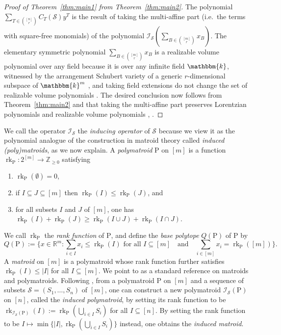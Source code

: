 \documentclass{amsart}
\newcommand{\RR}{\mathbb R}
\newcommand{\ZZ}{\mathbb Z}
\newcommand{\kk}{\mathbbm{k}}
\renewcommand{\P}{\mathrm{P}}
\theoremstyle{plain}
\theoremstyle{definition}
\begin{document}
\begin{proof}[Proof of Theorem~\ref{thm:main1} from Theorem~\ref{thm:main2}]
The polynomial $\sum_{T \in \binom{[n]}{r}}  C_T(\mathcal S) y^T$ is the result of taking the multi-affine part (i.e.\ the terms with square-free monomials) of the polynomial $\mathcal I_{\mathcal S}(\sum_{B\in \binom{[m]}{r}} x_B)$.
The elementary symmetric polynomial $\sum_{B\in \binom{[m]}{r}} x_B$ is a realizable volume polynomial over any field because it is over any infinite field $\kk$, witnessed by the arrangement Schubert variety of a generic $r$-dimensional subspace of $\kk^m$ \cite[Example 3.5]{Huh2026VolumePolynomials}, and taking field extensions do not change the set of realizable volume polynomials \cite[Proposition 2.10]{GHMSW2025volpres}.
The desired conclusion now follows from Theorem~\ref{thm:main2} and that taking the multi-affine part preserves Lorentzian polynomials and realizable volume polynomials \cite[Corollary~3.5]{BH20}, \cite[Corollary~3.3]{GHMSW2025volpres}.
\end{proof}

We call the operator $\mathcal I_{\mathcal S}$ the \emph{inducing operator} of $\mathcal S$ because we view it as the polynomial analogue of the construction in matroid theory called \emph{induced (poly)matroids}, as we now explain.
A \emph{polymatroid} $\P$ on $[m]$ is a {function} $\operatorname{rk}_{\P}: 2^{[m]} \to \ZZ_{\geq 0}$ satisfying
\begin{enumerate}[label = (\roman*)]
\item $\operatorname{rk}_\P(\emptyset) = 0$,
\item if $I\subseteq J \subseteq [m]$ then $\operatorname{rk}_\P(I) \leq \operatorname{rk}_\P(J)$, and
\item for all subsets $I$ and $J$ of $[m]$, one has $\operatorname{rk}_\P(I) + \operatorname{rk}_\P(J) \geq \operatorname{rk}_\P(I\cup J) + \operatorname{rk}_\P(I\cap J)$.
\end{enumerate}
We call $\operatorname{rk}_\P$ the \emph{rank function} of $\P$, and define the \emph{base polytope} $Q(\P)$ of $\P$ by
\[
Q(\P) := \Big\{x \in \RR^m : \sum_{i\in I} x_i \leq \operatorname{rk}_\P(I) \text{ for all $I\subseteq [m]$}\quad \text{and}\quad \sum_{i\in [m]} x_i = \operatorname{rk}_\P([m])\Big\}.
\]
A \emph{matroid} on $[m]$ is a polymatroid whose rank function further satisfies $\operatorname{rk}_\P(I) \leq |I|$ for all $I \subseteq [m]$.
We point to \cite{Welsh} as a standard reference on matroids and polymatroids.
Following \cite[Chapter~8.2]{Welsh}, from a polymatroid $\P$ on $[m]$ and a sequence of subsets $\mathcal S = (S_1, \dotsc, S_n)$ of $[m]$, one can construct a new polymatroid $\mathcal I_{\mathcal S}(\P)$ on $[n]$, called the \emph{induced polymatroid}, by setting its rank function to be $\operatorname{rk}_{\mathcal I_{\mathcal S}(\P)}(I) := \operatorname{rk}_\P(\bigcup_{i\in I}S_i)$ for all $I\subseteq [n]$.  By setting the rank function to be $I\mapsto \min\{|I|, \operatorname{rk}_\P(\bigcup_{i\in I}S_i)\}$ instead, one obtains the \emph{induced matroid}.
\end{document}
